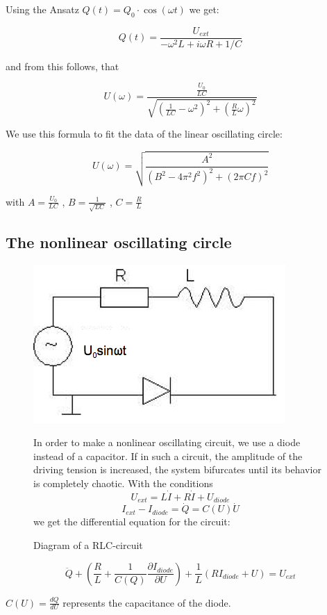 Using the Ansatz $Q(t) = Q_0 \cdot\cos(\omega t)$ we get:

$$Q(t) = \frac{U_{ext}}{-\omega^2L+i\omega R + 1/C}$$

and from this follows, that

$$U(\omega) = \frac{ \frac{U_0}{LC} }{ \sqrt{ (\frac{1}{LC} - \omega^2 )^2+ (\frac{R}{L}\omega)^2}}$$

We use this formula to fit the data of the linear oscillating circle:

\begin{equation} U(\omega) = \sqrt{\frac{A^2}{(B^2-4\pi^2f^2)^2 + (2\pi Cf)^2}} \end{equation}

with  $A=\frac{U_0}{LC}$ ,  $B=\frac{1}{\sqrt{LC}}$ ,  $C=\frac{R}{L}$

\subsection{The nonlinear oscillating circle}
\begin{figure}[H]
\begin{minipage}{0.5\textwidth}
\includegraphics[width=\textwidth]{Bilder/nlcirc.png}
\caption{Diagram of a RLC-circuit}
\end{minipage}
\begin{minipage}{0.5\textwidth}
In order to make a nonlinear oscillating circuit, we use a diode instead of a capacitor. If in such a circuit, the amplitude of the driving tension is increased, the system bifurcates until its behavior is completely chaotic. With the conditions
$$U_{ext} = L\dot I + R\dot I + U_{diode}$$
$$I_{ext}-I_{diode} = \dot Q = C(U)\dot U$$
we get the differential equation for the circuit:
\end{minipage}
\end{figure}

\begin{equation} 
\ddot Q + \left(\frac{R}{L} + \frac{1}{C(Q)} \frac{\partial I_{diode}}{\partial U}\right) + \frac{1}{L}(RI_{diode}+U)=U_{ext} \end{equation}

$C(U) = \frac{dQ}{dU}$ represents the capacitance of the diode.








